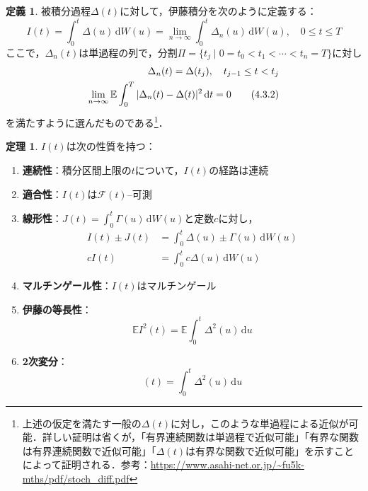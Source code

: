 \documentclass[a4paper, lualatex, ja=standard]{bxjsarticle}
\theoremstyle{definition}
\newtheorem{thm}{定理}[subsection]
\newtheorem*{dfn*}{定義}
\newcommand{\F}{\mathcal{F}}
\newcommand{\E}{\mathbb{E}}
\newcommand{\diff}{\mathrm{d}}
\begin{document}
\begin{dfn*}
  被積分過程$\Delta(t)$に対して，伊藤積分を次のように定義する：
  \begin{equation}
    I(t) = \int_0^t \Delta(u)\,\diff W(u)=\lim_{n\to\infty}\int_0^t\Delta_n(u)\,\diff W(u),\quad 0\leq t\leq T \tag{4.3.3}
  \end{equation}
  ここで，$\Delta_n(t)$は単過程の列で，分割$\Pi=\{t_j\mid 0=t_0<t_1<\cdots<t_n=T\}$に対し
  \begin{align}
    \Delta_n(t) = \Delta(t_j),\quad t_{j-1}\leq t < t_j\notag\\
    \lim_{n\to\infty}\E\int_0^T|\Delta_n(t)-\Delta(t)|^2\,\diff t=0 \tag{4.3.2}
  \end{align}
  を満たすように選んだものである\footnote{上述の仮定を満たす一般の$\Delta(t)$に対し，このような単過程による近似が可能．詳しい証明は省くが，「有界連続関数は単過程で近似可能」「有界な関数は有界連続関数で近似可能」「$\Delta(t)$は有界な関数で近似可能」を示すことによって証明される．参考：\url{https://www.asahi-net.or.jp/~fu5k-mths/pdf/stoch_diff.pdf}}．
\end{dfn*}
\setcounter{equation}{3}

\begin{thm}
  $I(t)$は次の性質を持つ：
  \begin{enumerate}
    \item \textbf{連続性}：積分区間上限の$t$について，$I(t)$の経路は連続
    \item \textbf{適合性}：$I(t)$は$\F(t)$--可測
    \item \textbf{線形性}：$J(t)=\int_0^t\Gamma(u)\,\diff W(u)$と定数$c$に対し，
    \begin{align*}
      I(t)\pm J(t) &= \int_0^t \Delta(u)\pm\Gamma(u)\,\diff W(u)\\
      cI(t) &= \int_0^t c\Delta(u)\,\diff W(u)
    \end{align*}
    \item \textbf{マルチンゲール性}：$I(t)$はマルチンゲール
    \item \textbf{伊藤の等長性}：
    \begin{equation*}
      \E I^2(t)=\E\int_0^t\Delta^2(u)\,\diff u
    \end{equation*}
    \item \textbf{2次変分}：
    \begin{equation*}
      [I,I](t) = \int_0^t\Delta^2(u)\,\diff u
    \end{equation*}
  \end{enumerate}
\end{thm}
\end{document}
